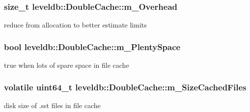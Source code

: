 \subsubsection[{m\+\_\+\+Overhead}]{\setlength{\rightskip}{0pt plus 5cm}size\+\_\+t leveldb\+::\+Double\+Cache\+::m\+\_\+\+Overhead\hspace{0.3cm}{\ttfamily [protected]}}\label{classleveldb_1_1_double_cache_a76eda02c403cf6bc7f225f612ce098ff}


reduce from allocation to better estimate limits 

\hypertarget{classleveldb_1_1_double_cache_a560a908cafaf2dffae1d375c28ad719e}{}
\subsubsection[{m\+\_\+\+Plenty\+Space}]{\setlength{\rightskip}{0pt plus 5cm}bool leveldb\+::\+Double\+Cache\+::m\+\_\+\+Plenty\+Space\hspace{0.3cm}{\ttfamily [protected]}}\label{classleveldb_1_1_double_cache_a560a908cafaf2dffae1d375c28ad719e}


true when lots of spare space in file cache 

\hypertarget{classleveldb_1_1_double_cache_ab1c67e0adcd9a23eb0bef43d32f24c98}{}
\subsubsection[{m\+\_\+\+Size\+Cached\+Files}]{\setlength{\rightskip}{0pt plus 5cm}volatile {\bf uint64\+\_\+t} leveldb\+::\+Double\+Cache\+::m\+\_\+\+Size\+Cached\+Files\hspace{0.3cm}{\ttfamily [protected]}}\label{classleveldb_1_1_double_cache_ab1c67e0adcd9a23eb0bef43d32f24c98}


disk size of .sst files in file cache 

\hypertarget{classleveldb_1_1_double_cache_a1e37f45144f9a47321def85cd7ceca0b}{}
